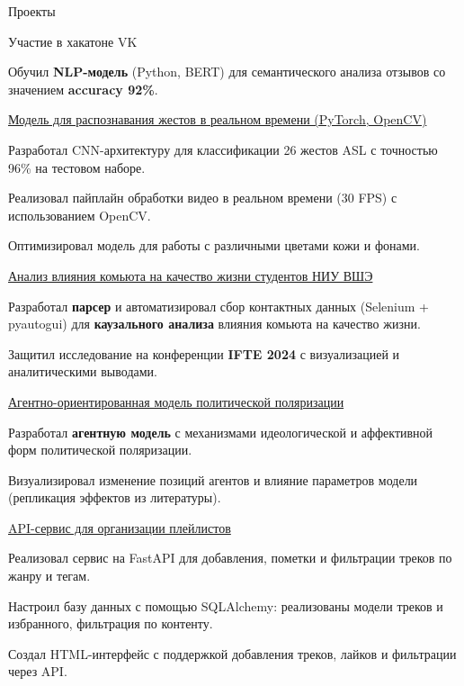 \documentclass[10pt]{resume} %
\begin{document}
\begin{rSection}{Проекты}

\begin{rSubsection}{Участие в хакатоне VK}{}{}{}
    \item Обучил \textbf{NLP-модель} (Python, BERT) для семантического анализа отзывов со значением \textbf{accuracy 92\%}.
\end{rSubsection}

\begin{rSubsection}{\href{https://github.com/mrariv/asl_recognition}{Модель для распознавания жестов в реальном времени (PyTorch, OpenCV)}}{}{}{}
    \item Разработал CNN-архитектуру для классификации 26 жестов ASL с точностью 96\% на тестовом наборе.
    \item Реализовал пайплайн обработки видео в реальном времени (30 FPS) с использованием OpenCV.
    \item Оптимизировал модель для работы с различными цветами кожи и фонами.
\end{rSubsection}

\begin{rSubsection}{\href{https://github.com/mrariv/commute_project}{Анализ влияния комьюта на качество жизни студентов НИУ ВШЭ}}{}{}{}
    \item Разработал \textbf{парсер} и автоматизировал сбор контактных данных (Selenium + pyautogui) для \textbf{каузального анализа} влияния комьюта на качество жизни.
    \item Защитил исследование на конференции \textbf{IFTE 2024} с визуализацией и аналитическими выводами.
\end{rSubsection}

\begin{rSubsection}{\href{https://github.com/mrariv/model_polarization}{Агентно-ориентированная модель политической поляризации}}{}{}{}
    \item Разработал \textbf{агентную модель} с механизмами идеологической и аффективной форм политической поляризации.
    \item Визуализировал изменение позиций агентов и влияние параметров модели (репликация эффектов из литературы).
\end{rSubsection}

\begin{rSubsection}{\href{https://github.com/mrariv/playlist-manager}{API-сервис для организации плейлистов}}{}{}{}
    \item Реализовал сервис на FastAPI для добавления, пометки и фильтрации треков по жанру и тегам.
    \item Настроил базу данных с помощью SQLAlchemy: реализованы модели треков и избранного, фильтрация по контенту.
    \item Создал HTML-интерфейс с поддержкой добавления треков, лайков и фильтрации через API.
\end{rSubsection}

\end{rSection}
\end{document}
